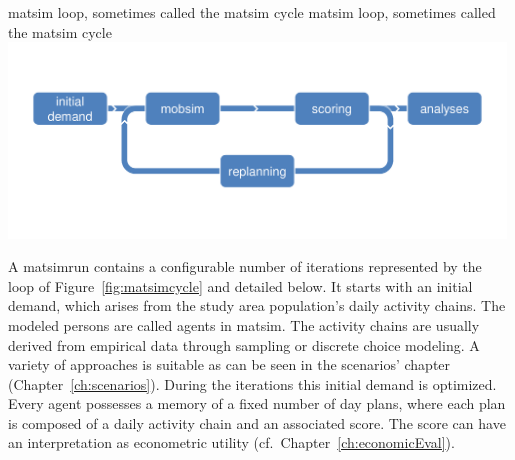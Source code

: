 \createfigure%
{\protect\gls{matsim} loop, sometimes called the \protect\gls{matsim} cycle}%
{\protect\gls{matsim} loop, sometimes called the \protect\gls{matsim} cycle  }%
{\label{fig:matsimcycle}}%
{\includegraphics[width=0.99\textwidth, angle=0]{figures/matsimcycle.pdf}}%
{}

A \gls{matsimrun} contains a configurable number of iterations represented by the loop of Figure~\ref{fig:matsimcycle} and detailed below. 
%
It starts with an initial demand, which arises from the \gls{study} area population's daily activity chains. The modeled persons are called agents in \gls{matsim}. The activity chains are usually derived from empirical data through sampling or discrete choice modeling. A variety of approaches is suitable as can be seen in the scenarios' chapter (Chapter~\ref{ch:scenarios}). During the iterations this initial demand is optimized. Every agent possesses a memory of a fixed number of day plans, where each \gls{plan} is composed of a daily activity chain and an associated \gls{score}.  The score can have an interpretation as econometric utility (cf.~Chapter~\ref{ch:economicEval}).

